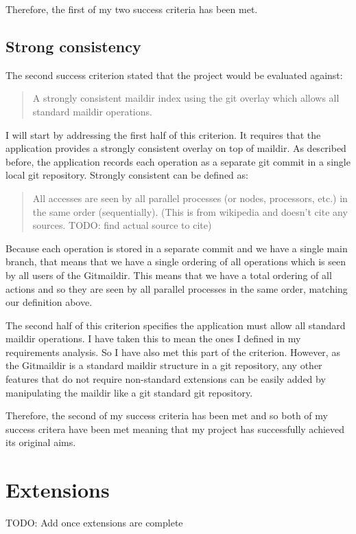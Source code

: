 Therefore, the first of my two success criteria has been met.

\subsection{Strong consistency}

The second success criterion stated that the project would be evaluated against:

\begin{quote}
  A strongly consistent maildir index using the git overlay which allows all standard maildir operations.
\end{quote}

I will start by addressing the first half of this criterion. It requires that the application provides a strongly consistent overlay on top of maildir. As described before, the application records each operation as a separate git commit in a single local git repository. Strongly consistent can be defined as:
\begin{quote}
  All accesses are seen by all parallel processes (or nodes, processors, etc.) in the same order (sequentially). (This is from wikipedia and doesn't cite any sources. TODO: find actual source to cite)
\end{quote}
Because each operation is stored in a separate commit and we have a single main branch, that means that we have a single ordering of all operations which is seen by all users of the Gitmaildir. This means that we have a total ordering of all actions and so they are seen by all parallel processes in the same order, matching our definition above.

The second half of this criterion specifies the application must allow all standard maildir operations. I have taken this to mean the ones I defined in my requirements analysis. So I have also met this part of the criterion. However, as the Gitmaildir is a standard maildir structure in a git repository, any other features that do not require non-standard extensions can be easily added by manipulating the maildir like a git standard git repository.

Therefore, the second of my success criteria has been met and so both of my success critera have been met meaning that my project has successfully achieved its original aims.

\section{Extensions}

TODO: Add once extensions are complete
